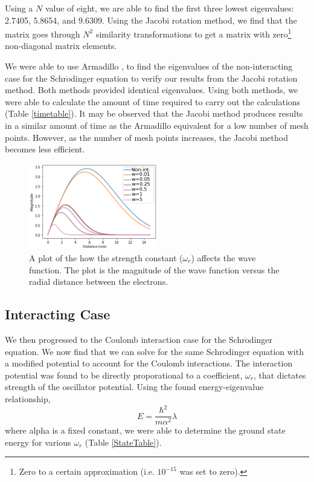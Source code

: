 \documentclass[%
reprint,
superscriptaddress,
showpacs,
nofootinbib,
bibnotes,amsmath,amssymb,aps,
prc, 
]{revtex4-1}
\begin{document}
	Using a $N$ value of eight, we are able to find the first three lowest eigenvalues: 2.7405, 5.8654, and 9.6309.  Using the Jacobi rotation method, we find that the matrix goes through $N^{2}$ similarity transformations to get a matrix with zero\footnote{Zero to a certain approximation (i.e. $10^{-15}$ was set to zero).} non-diagonal matrix elements.
	
	
	We were able to use Armadillo \cite{Armadillo}, to find the eigenvalues of the non-interacting case for the Schr$\ddot{\textrm{o}}$dinger equation to verify our results from the Jacobi rotation method. Both methods provided identical eigenvalues.  Using both methods, we were able to calculate the amount of time required to carry out the calculations (Table \ref{timetable}).  It may be observed that the Jacobi method produces results in a similar amount of time as the Armadillo equivalent for a low number of mesh points.  However, as the number of mesh points increases, the Jacobi method becomes less efficient.
	
	
	\begin{figure}
		\centering
		\includegraphics[width=0.5\textwidth]{Graph.eps}
		\caption{A plot of the how the strength constant ($\omega_{r}$) affects the wave function.  The plot is the magnitude of the wave function versus the radial distance between the electrons. }
		\label{fig:graph}
	\end{figure}
	
	
	\subsection{Interacting Case}
	
	We then progressed to the Coulomb interaction case for the Schr$\ddot{\textrm{o}}$dinger equation.  We now find that we can solve for the same Schr$\ddot{\textrm{o}}$dinger equation with a modified potential to account for the Coulomb interactions.  The interaction potential was found to be directly proporational to a coefficient, $\omega_{r}$, that dictates strength of the oscillator potential.  Using the found energy-eigenvalue relationship, \begin{equation}
	E=\frac{\hbar^{2}}{m\alpha^{2}}\lambda
	\end{equation} where alpha is a fixed constant, we were able to determine the ground state energy for various $\omega_{r}$ (Table \ref{StateTable}).
	
\end{document}
